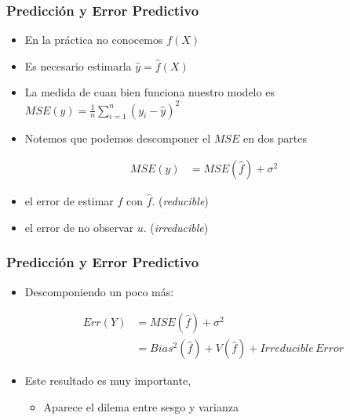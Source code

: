 \documentclass[
  shownotes,
  xcolor={svgnames},
  hyperref={colorlinks,citecolor=DarkBlue,linkcolor=DarkRed,urlcolor=DarkBlue}
  , aspectratio=169]{beamer}
\begin{document}
\begin{frame}
\frametitle{Predicción y Error Predictivo}

\begin{itemize}
  \item En la práctica no conocemos $f(X)$
  \medskip
  \item Es necesario estimarla $\hat y = \hat f(X)$ 
  \medskip
  \item La medida de cuan bien funciona nuestro modelo es $MSE(y)= \frac{1}{n} \sum_{i=1}^n (y_i - \hat{y} )^2$
  \medskip
  \item Notemos que podemos descomponer el $MSE$ en dos partes
\end{itemize}

\begin{align}
  MSE (  y )  &= MSE(\hat f) + \sigma^2  
\end{align}
\medskip
\begin{itemize}
  \item  el error de estimar $f$ con $\hat f$. (\emph{reducible})
  \item  el error de no observar $u$. (\emph{irreducible})
\end{itemize}

\medskip

\end{frame}

\begin{frame}
\frametitle{Predicción y Error Predictivo}

\begin{itemize}
  \item Descomponiendo un poco más:
  


\medskip

\begin{align}
  Err (  Y )  &= MSE(\hat f) + \sigma^2  \\
                 &= Bias^2(\hat f) + V(\hat f) +  Irreducible\,Error
\end{align}
\medskip

\item Este resultado es muy importante,  
\begin{itemize}
\item Aparece el  dilema entre sesgo y varianza
\end{itemize}
\end{itemize}
\end{frame}
\end{document}
